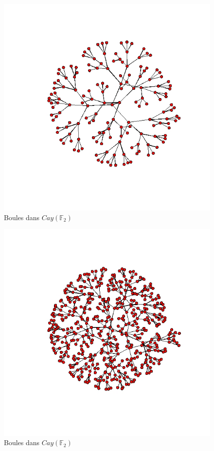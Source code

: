 \documentclass{beamer}
\begin{document}
\begin{frame}
\begin{figure}[h]\centering
\includegraphics[scale=0.35]{CayleyFree3.jpeg}
\caption{Boules dans $Cay(\mathbb F_2)$}
\label{fig:Cayley}
\end{figure}
\end{frame}
\begin{frame}
\begin{figure}[h]\centering
\includegraphics[scale=0.35]{CayleyFree4.jpeg}
\caption{Boules dans $Cay(\mathbb F_2)$}
\label{fig:Cayley}
\end{figure}
\end{frame}
\end{document}
